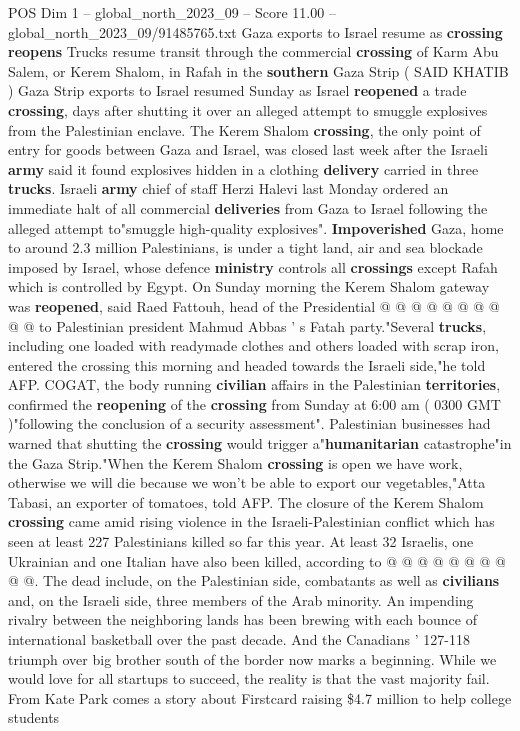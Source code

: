 \begin{textsample}{POS Dim 1 – global\_north\_2023\_09 – Score 11.00 – global\_north\_2023\_09/91485765.txt}  \label{ex:f1_pos_357}
Gaza exports to Israel resume as \textbf{crossing} \textbf{reopens} Trucks resume transit through the commercial \textbf{crossing} of Karm Abu Salem, or Kerem Shalom, in Rafah in the \textbf{southern} Gaza Strip ( SAID KHATIB ) Gaza Strip exports to Israel resumed Sunday as Israel \textbf{reopened} a trade \textbf{crossing}, days after shutting it over an alleged attempt to smuggle explosives from the Palestinian enclave.
The Kerem Shalom \textbf{crossing}, the only point of entry for goods between Gaza and Israel, was closed last week after the Israeli \textbf{army} said it found explosives hidden in a clothing \textbf{delivery} carried in three \textbf{trucks}.
Israeli \textbf{army} chief of staff Herzi Halevi last Monday ordered an immediate halt of all commercial \textbf{deliveries} from Gaza to Israel following the alleged attempt to"smuggle high-quality explosives". \textbf{Impoverished} Gaza, home to around 2.3 million Palestinians, is under a tight land, air and sea blockade imposed by Israel, whose defence \textbf{ministry} controls all \textbf{crossings} except Rafah which is controlled by Egypt.
On Sunday morning the Kerem Shalom gateway was \textbf{reopened}, said Raed Fattouh, head of the Presidential @ @ @ @ @ @ @ @ @ @ to Palestinian president Mahmud Abbas ' s Fatah party."Several \textbf{trucks}, including one loaded with readymade clothes and others loaded with scrap iron, entered the crossing this morning and headed towards the Israeli side,"he told AFP.
COGAT, the body running \textbf{civilian} affairs in the Palestinian \textbf{territories}, confirmed the \textbf{reopening} of the \textbf{crossing} from Sunday at 6:00 am ( 0300 GMT )"following the conclusion of a security assessment".
Palestinian businesses had warned that shutting the \textbf{crossing} would trigger a"\textbf{humanitarian} catastrophe"in the Gaza Strip."When the Kerem Shalom \textbf{crossing} is open we have work, otherwise we will die because we won't be able to export our vegetables,"Atta Tabasi, an exporter of tomatoes, told AFP.
The closure of the Kerem Shalom \textbf{crossing} came amid rising violence in the Israeli-Palestinian conflict which has seen at least 227 Palestinians killed so far this year.
At least 32 Israelis, one Ukrainian and one Italian have also been killed, according to @ @ @ @ @ @ @ @ @ @.
The dead include, on the Palestinian side, combatants as well as \textbf{civilians} and, on the Israeli side, three members of the Arab minority.
An impending rivalry between the neighboring lands has been brewing with each bounce of international basketball over the past decade.
And the Canadians ' 127-118 triumph over big brother south of the border now marks a beginning.
While we would love for all startups to succeed, the reality is that the vast majority fail.
From Kate Park comes a story about Firstcard raising \$4.7 million to help college students

\end{textsample}
